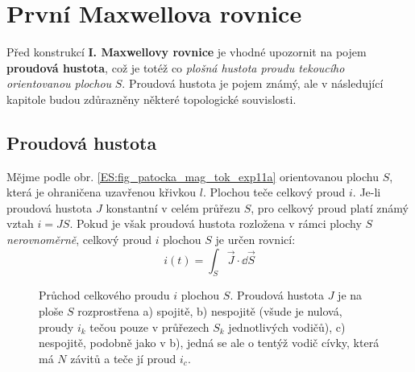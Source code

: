     \section{První Maxwellova rovnice}\label{ES:sec07}
      Před konstrukcí \textbf{I. Maxwellovy rovnice} je vhodné upozornit na pojem \textbf{proudová 
      hustota}, což je totéž co \emph{plošná hustota proudu tekoucího orientovanou plochou} \(S\). 
      Proudová hustota je pojem známý, ale v následující kapitole budou zdůrazněny některé 
      topologické souvislosti.
      
      \subsection{Proudová hustota}
        Mějme podle obr. \ref{ES:fig_patocka_mag_tok_exp11a} orientovanou plochu \(S\), která je 
        ohraničena uzavřenou křivkou \(l\). Plochou teče celkový proud \(i\). Je-li proudová 
        hustota \(J\) konstantní v celém průřezu \(S\), pro celkový proud platí známý vztah \(i = 
        JS\). Pokud je však proudová hustota rozložena v rámci plochy \(S\) \emph{nerovnoměrně}, 
        celkový proud \(i\) plochou \(S\) je určen rovnicí:
        \begin{equation}\label{TEO:eq122}
          i(t) = \int_S\vec{J}\cdot \dd{\vec{S}}
        \end{equation}         
        \begin{figure}[ht!]
          \centering  
          \caption{Průchod celkového proudu \(i\) plochou \(S\). Proudová hustota \(J\) je na 
                   ploše \(S\) rozprostřena a) spojitě, b) nespojitě (všude je nulová, proudy 
                   \(i_k\) tečou pouze v průřezech \(S_k\) jednotlivých vodičů), c) nespojitě, 
                   podobně jako v b), jedná se ale o tentýž vodič cívky, která má \(N\) závitů a 
                   teče jí proud \(i_c\).} 
          \label{ES:fig_patocka_mag_tok_exp11}
        \end{figure}
      
